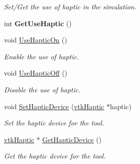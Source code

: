 \begin{DoxyCompactItemize}
\begin{DoxyCompactList}\small\item\em Set/Get the use of haptic in the simulation. \item\end{DoxyCompactList}\item 
\hypertarget{classvtkTool_ab45c67813a8a720fd8316c5404272ed6}{
int {\bfseries GetUseHaptic} ()}
\label{classvtkTool_ab45c67813a8a720fd8316c5404272ed6}

\item 
\hypertarget{classvtkTool_a90f29a8672f01fac0e22c54b704f8bb4}{
void \hyperlink{classvtkTool_a90f29a8672f01fac0e22c54b704f8bb4}{UseHapticOn} ()}
\label{classvtkTool_a90f29a8672f01fac0e22c54b704f8bb4}

\begin{DoxyCompactList}\small\item\em Enable the use of haptic. \item\end{DoxyCompactList}\item 
\hypertarget{classvtkTool_af9c1ebcf72b55b97daf6c22023f3b063}{
void \hyperlink{classvtkTool_af9c1ebcf72b55b97daf6c22023f3b063}{UseHapticOff} ()}
\label{classvtkTool_af9c1ebcf72b55b97daf6c22023f3b063}

\begin{DoxyCompactList}\small\item\em Disable the use of haptic. \item\end{DoxyCompactList}\item 
\hypertarget{classvtkTool_aef7be40911dabe0da8e3ab32ef9b5f80}{
void \hyperlink{classvtkTool_aef7be40911dabe0da8e3ab32ef9b5f80}{SetHapticDevice} (\hyperlink{classvtkHaptic}{vtkHaptic} $\ast$haptic)}
\label{classvtkTool_aef7be40911dabe0da8e3ab32ef9b5f80}

\begin{DoxyCompactList}\small\item\em Set the haptic device for the tool. \item\end{DoxyCompactList}\item 
\hypertarget{classvtkTool_a2ad2583dbcf7a7363107a2c29e1b8543}{
\hyperlink{classvtkHaptic}{vtkHaptic} $\ast$ \hyperlink{classvtkTool_a2ad2583dbcf7a7363107a2c29e1b8543}{GetHapticDevice} ()}
\label{classvtkTool_a2ad2583dbcf7a7363107a2c29e1b8543}

\begin{DoxyCompactList}\small\item\em Get the haptic device for the tool. \item\end{DoxyCompactList}\end{DoxyCompactItemize}

